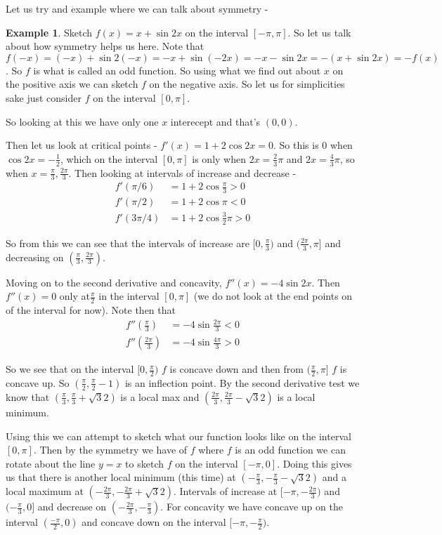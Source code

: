 \documentclass[12pt,reqno]{article}
\theoremstyle{definition}
\newtheorem*{Example}{Example}
\begin{document}
Let us try and example where we can talk about symmetry - 
\begin{Example}
	Sketch $f(x) = x + \sin 2x$ on the interval $[-\pi, \pi]$. So let us talk about how symmetry helps us here. Note that $f(-x) = (-x) + \sin 2(-x) = -x + \sin (-2x) = -x - \sin 2x = - (x + \sin 2x) = - f(x)$. So $f$ is what is called an odd function. So using what we find out about $x$ on the positive axis we can sketch $f$ on the negative axis. So let us for simplicities sake just consider $f$ on the interval $[0, \pi]$. 
	
	So looking at this we have only one $x$ interecept and that's $(0, 0)$. 
	
	Then let us look at critical points - $f'(x) = 1 + 2 \cos 2x = 0$. So this is $0$ when $\cos 2x = - \frac{1}{2}$, which on the interval $[0, \pi]$ is only when $2x = \frac{2}{3}\pi$ and $2x = \frac{4}{3}\pi$, so when $x = \frac{\pi}{3}, \frac{2\pi}{3}$. Then looking at intervals of increase and decrease - 
	\begin{align*}
		f'(\pi/ 6) &= 1 + 2 \cos \frac{\pi}{3} > 0  \\
		f'(\pi/2) &= 1 + 2 \cos \pi < 0 \\
		f'(3\pi/4) &= 1 + 2 \cos \frac{3}{2}\pi > 0 
	\end{align*}
	
	So from this we can see that the intervals of increase are $[0, \frac{\pi}{3})$ and $(\frac{2\pi}{3}, \pi]$ and decreasing on $(\frac{\pi}{3}, \frac{2\pi}{3})$. 
	
	Moving on to the second derivative and concavity, $f''(x) = -4\sin 2x$. Then $f''(x) = 0$ only at$\frac{\pi}{2}$ in the interval $[0, \pi]$ (we do not look at the end points on of the interval for now). Note then that 
	\begin{align*}
		f''(\frac{\pi}{3})  &= -4 \sin \frac{2\pi}{3} < 0 \\	
		f''(\frac{2\pi}{3}) &= -4 \sin \frac{4\pi}{3} > 0
	\end{align*}
	
	So we see that on the interval $[0, \frac{\pi}{2})$ $f$ is concave down and then from $(\frac{\pi}{2}, \pi]$ $f$ is concave up. So $(\frac{\pi}{2}, \frac{\pi}{2} - 1)$ is an inflection point. By the second derivative test we know that $(\frac{\pi}{3}, \frac{\pi}{3} + \sqrt{3}{2})$ is a local max and $(\frac{2\pi}{3}, \frac{2\pi}{3} - \sqrt{3}{2})$ is a local minimum. 
	
	Using this we can attempt to sketch what our function looks like on the interval $[0, \pi]$. Then by the symmetry we have of $f$ where $f$ is an odd function we can rotate about the line $y = x$ to sketch $f$ on the interval $[- \pi, 0]$. Doing this gives us that there is another local minimum (this time) at $(-\frac{\pi}{3}, - \frac{\pi}{3} - \sqrt{3}{2})$ and a local maximum at $(-\frac{2\pi}{3}, -\frac{2\pi}{3} + \sqrt{3}{2})$. Intervals of increase at $[-\pi, -\frac{2\pi}{3})$ and $(-\frac{\pi}{3}, 0]$ and decrease on $(-\frac{2\pi}{3}, -\frac{\pi}{3})$. For concavity we have concave up on the interval $(\frac{-\pi}{2}, 0)$ and concave down on the interval $[-\pi, -\frac{\pi}{2})$. 
	

\end{Example}
\end{document}
